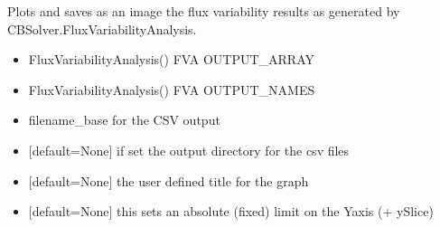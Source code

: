 \documentclass[letterpaper,12pt,english]{sphinxmanual}
\begin{document}
\begin{fulllineitems}
\label{\detokenize{api/visualization:cbmpy.CBPlot.plotFluxVariability}}
\pysigstartsignatures
\pysiglinewithargsret
{}
{\sphinxparamcomma {}\sphinxparamcomma {}\sphinxparamcomma {}\sphinxparamcomma {}\sphinxparamcomma {}\sphinxparamcomma {}\sphinxparamcomma {}\sphinxparamcomma {}\sphinxparamcomma {}\sphinxparamcomma {}\sphinxparamcomma {}}
{}
\pysigstopsignatures
\sphinxAtStartPar
Plots and saves as an image the flux variability results as generated by
CBSolver.FluxVariabilityAnalysis.
\begin{itemize}
\item {} 
\sphinxAtStartPar
{} FluxVariabilityAnalysis() FVA OUTPUT\_ARRAY

\item {} 
\sphinxAtStartPar
{} FluxVariabilityAnalysis() FVA OUTPUT\_NAMES

\item {} 
\sphinxAtStartPar
{} filename\_base for the CSV output

\item {} 
\sphinxAtStartPar
{} {[}default=None{]} if set the output directory for the csv files

\item {} 
\sphinxAtStartPar
{} {[}default=None{]} the user defined title for the graph

\item {} 
\sphinxAtStartPar
{} {[}default=None{]} this sets an absolute (fixed) limit on the Y\sphinxhyphen{}axis (+\sphinxhyphen{} ySlice)


\end{itemize}
\end{fulllineitems}
\end{document}
